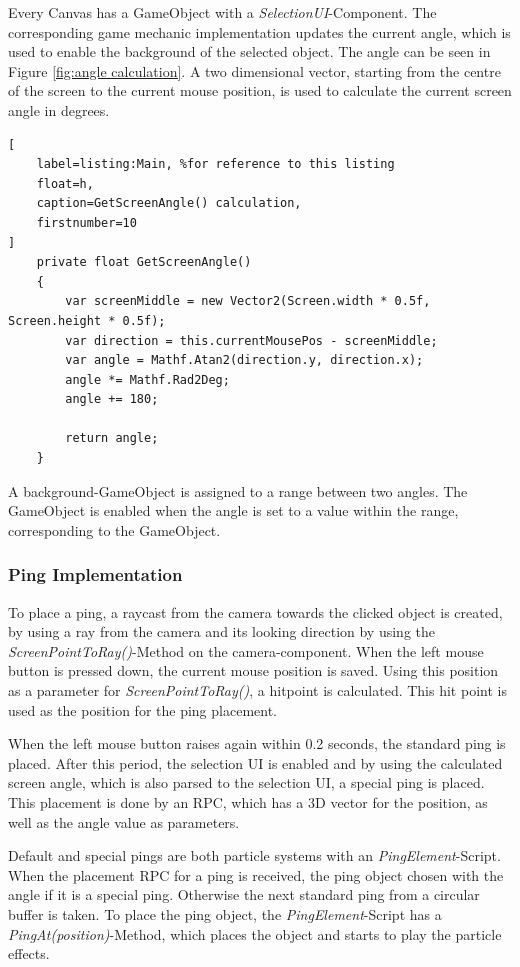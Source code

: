 Every Canvas has a GameObject with a \textit{SelectionUI}-Component. The corresponding game mechanic implementation updates the current angle, which is used to enable the background of the selected object. The angle can be seen in Figure \ref{fig:angle calculation}. A two dimensional vector, starting from the centre of the screen to the current mouse position, is used to calculate the current screen angle in degrees.

\begin{lstlisting}[
	label=listing:Main, %for reference to this listing
	float=h,
	caption=GetScreenAngle() calculation,
	firstnumber=10
]
    private float GetScreenAngle()
    {
        var screenMiddle = new Vector2(Screen.width * 0.5f, Screen.height * 0.5f);
        var direction = this.currentMousePos - screenMiddle;
        var angle = Mathf.Atan2(direction.y, direction.x);
        angle *= Mathf.Rad2Deg;
        angle += 180;

        return angle;
    }
\end{lstlisting}

A background-GameObject is assigned to a range between two angles. The GameObject is enabled when the angle is set to a value within the range, corresponding to the GameObject.



\subsubsection{Ping Implementation}

To place a ping, a raycast from the camera towards the clicked object is created, by using a ray from the camera and its looking direction by using the \textit{ScreenPointToRay()}-Method on the camera-component. When the left mouse button is pressed down, the current mouse position is saved. Using this position as a parameter for \textit{ScreenPointToRay()}, a hitpoint is calculated. This hit point is used as the position for the ping placement.

When the left mouse button raises again within 0.2 seconds, the standard ping is placed. After this period, the selection UI is enabled and by using the calculated screen angle, which is also parsed to the selection UI, a special ping is placed. This placement is done by an RPC, which has a 3D vector for the position, as well as the angle value as parameters.

Default and special pings are both particle systems with an \textit{PingElement}-Script.
When the placement RPC for a ping is received, the ping object chosen with the angle if it is a special ping. Otherwise the next standard ping from a circular buffer is taken. To place the ping object, the \textit{PingElement}-Script has a \textit{PingAt(position)}-Method, which places the object and starts to play the particle effects.

